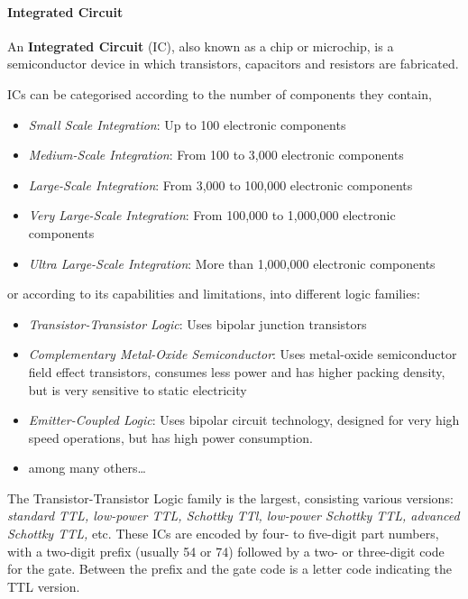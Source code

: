 \paragraph{Integrated Circuit}
\begin{definition}
  An \textbf{Integrated Circuit }(IC), also known as a chip or microchip, is a
  semiconductor device in which transistors, capacitors and resistors are
  fabricated.
\end{definition}
ICs can be categorised according to the number of components they contain,
\begin{itemize}
  \item \textit{Small Scale Integration}: Up to 100 electronic components
  \item \textit{Medium-Scale Integration}: From 100 to 3,000 electronic components
  \item \textit{Large-Scale Integration}: From 3,000 to 100,000 electronic components
  \item \textit{Very Large-Scale Integration}: From 100,000 to 1,000,000 electronic components
  \item \textit{Ultra Large-Scale Integration}: More than 1,000,000 electronic components
\end{itemize}
or according to its capabilities and limitations, into different logic families:
\begin{itemize}
  \item \textit{Transistor-Transistor Logic}: Uses bipolar junction transistors
  \item \textit{Complementary Metal-Oxide Semiconductor}: Uses metal-oxide
    semiconductor field effect transistors, consumes less power and has higher
    packing density, but is very sensitive to static electricity
  \item \textit{Emitter-Coupled Logic}: Uses bipolar circuit technology,
    designed for very high speed operations, but has high power consumption.
  \item among many others…
\end{itemize}

\begin{example}[TTL]
  The Transistor-Transistor Logic family is the largest, consisting various
  versions: \textit{standard TTL, low-power TTL, Schottky TTl, low-power
  Schottky TTL, advanced Schottky TTL,} etc. These ICs are encoded by four- to
  five-digit part numbers, with a two-digit prefix (usually 54 or 74) followed
  by a two- or three-digit code for the gate. Between the prefix and the gate
  code is a letter code indicating the TTL version.
\end{example}

